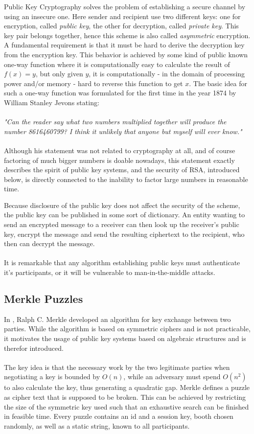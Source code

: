 Public Key Cryptography solves the problem of establishing a secure channel by using an insecure one.
Here sender and recipient use two different keys: one for encryption, called \textit{public key}, the other
for decryption, called \textit{private key}. This key pair belongs together, hence this scheme is also called \textit{asymmetric} encryption. A fundamental requirement
is that it must be hard
to derive the decryption key from the encryption key. This behavior is achieved by some kind of public known one-way function where it is computationally
easy to calculate the result of $f(x) = y$, but only given $y$, it is computationally - in the domain of processing power and/or memory - hard
to reverse this function to get $x$.
The basic idea for such a one-way function was formulated for the first time in the year 1874 by William Stanley Jevons stating:
\\
\\
\textit{"Can the reader say what two numbers multiplied together will produce the number 8616460799? I think it unlikely that anyone but myself will
ever know."} \cite{wStanley} 
\\
\\
Although his statement was not related to cryptography at all, and of course factoring of much bigger numbers is doable nowadays, this statement exactly describes
the spirit of public key systems, and the security of RSA, introduced below, is directly connected to the inability to factor large numbers in reasonable time.

Because disclosure of the public key does not affect the security of the scheme, the public key can be published in some sort of dictionary.
An entity wanting to send an encrypted message to a receiver can then look up the receiver's public key, encrypt the message and send the resulting
ciphertext to the recipient, who then can decrypt the message. 
\\
\\
It is remarkable that any algorithm establishing public keys must authenticate it's  participants, or it will be vulnerable to man-in-the-middle attacks.

\subsection{Merkle Puzzles}

In \cite{Merkle}, Ralph C. Merkle developed an algorithm for key exchange between two parties. While the algorithm is based on symmetric ciphers and is
not practicable, it motivates the usage of public key systems based on algebraic structures and is therefor introduced.
\\
\\
The key idea is that the necessary work by the two legitimate parties when negotiating a key is bounded by $O(n)$, while an adversary must spend $O(n^2)$ to 
also calculate the key, thus generating a quadratic gap. 
Merkle defines a puzzle as cipher text that is supposed to be broken. This can be achieved by restricting the size of the symmetric key used such that an
exhaustive search can be finished in feasible time. Every puzzle contains an id and a session key, booth chosen randomly, as well as a static string,
known to all participants.


